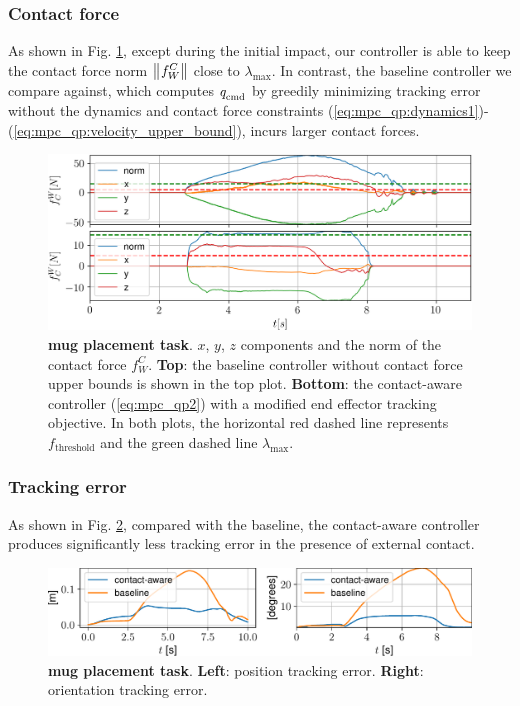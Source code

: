 \subsubsection{Contact force}
As shown in Fig. \ref{fig:mug_placement_damped_lsq_vs_ours}, except during the initial impact, our controller is able to keep the contact force norm $\left\lVert{{}^{}{f}^{C}_{W}}\right\rVert$ close to $\lambda_\text{max}$. In contrast, the baseline controller we compare against, which computes $q_{\text{cmd}}^{}$ by greedily minimizing tracking error without the dynamics and contact force constraints (\ref{eq:mpc_qp:dynamics1})-(\ref{eq:mpc_qp:velocity_upper_bound}), incurs larger contact forces.

\begin{figure}
\centering
\includegraphics[width=0.98\linewidth]{figures/04_control/mug_placement_force.png}
\caption{ \textbf{mug placement task}. $x$, $y$, $z$ components and the norm of the contact force $f_W^C$. \textbf{Top}: the baseline controller without contact force upper bounds is shown in the top plot. \textbf{Bottom}: the contact-aware controller (\ref{eq:mpc_qp2}) with a modified end effector tracking objective. In both plots, the horizontal red dashed line represents $f_\text{threshold}$ and the green dashed line $\lambda_\text{max}$.}
\label{fig:mug_placement_damped_lsq_vs_ours}
\end{figure}

\subsubsection{Tracking error}
As shown in Fig. \ref{fig:mug_placement_tracking_error}, compared with the baseline, the contact-aware controller produces significantly less tracking error in the presence of external contact.

\begin{figure}
\vspace{-0.2cm}
\centering
\includegraphics[width=1.0\linewidth]{figures/04_control/mug_placement_tracking_error.pdf}
\caption{\textbf{mug placement task}. \textbf{Left}: position tracking error. \textbf{Right}: orientation tracking error. }
\vspace{-0.6cm}
\label{fig:mug_placement_tracking_error}
\end{figure}

